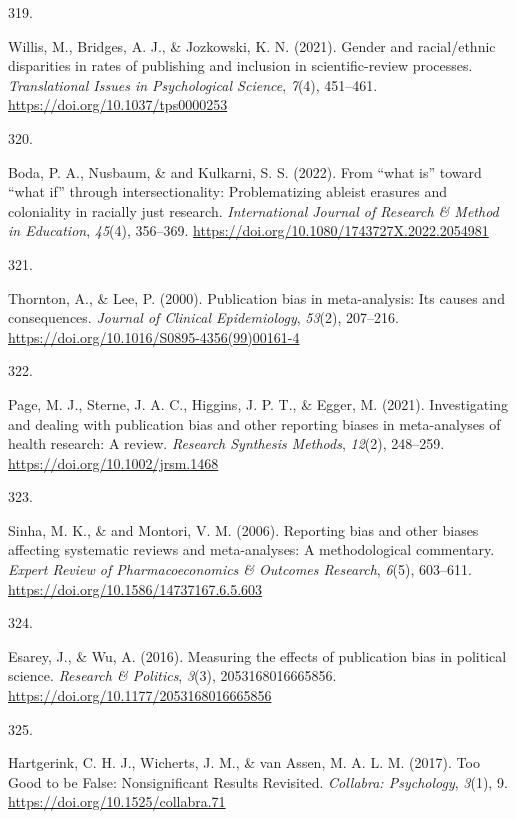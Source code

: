 \documentclass[
  11pt,
  letterpaper,
]{scrreprt}
\newlength{\cslhangindent}
\newlength{\csllabelwidth}
\newenvironment{CSLReferences}[2] %
 {\begin{list}{}{%
  \setlength{\itemindent}{0pt}
  \setlength{\leftmargin}{0pt}
  \setlength{\parsep}{0pt}
  \ifodd #1
   \setlength{\leftmargin}{\cslhangindent}
   \setlength{\itemindent}{-1\cslhangindent}
  \fi
  \setlength{\itemsep}{#2\baselineskip}}}
 {\end{list}}
\newcommand{\CSLLeftMargin}[1]{\parbox[t]{\csllabelwidth}{\strut#1\strut}}
\newcommand{\CSLRightInline}[1]{\parbox[t]{\linewidth - \csllabelwidth}{\strut#1\strut}}
\begin{document}
\begin{CSLReferences}{0}{0}
\CSLLeftMargin{319. }%
\CSLRightInline{Willis, M., Bridges, A. J., \& Jozkowski, K. N. (2021).
Gender and racial/ethnic disparities in rates of publishing and
inclusion in scientific-review processes. \emph{Translational Issues in
Psychological Science}, \emph{7}(4), 451--461.
\url{https://doi.org/10.1037/tps0000253}}

\CSLLeftMargin{320. }%
\CSLRightInline{Boda, P. A., Nusbaum, \& and Kulkarni, S. S. (2022).
From {``what is''} toward {``what if''} through intersectionality:
Problematizing ableist erasures and coloniality in racially just
research. \emph{International Journal of Research \& Method in
Education}, \emph{45}(4), 356--369.
\url{https://doi.org/10.1080/1743727X.2022.2054981}}

\CSLLeftMargin{321. }%
\CSLRightInline{Thornton, A., \& Lee, P. (2000). Publication bias in
meta-analysis: Its causes and consequences. \emph{Journal of Clinical
Epidemiology}, \emph{53}(2), 207--216.
\url{https://doi.org/10.1016/S0895-4356(99)00161-4}}

\CSLLeftMargin{322. }%
\CSLRightInline{Page, M. J., Sterne, J. A. C., Higgins, J. P. T., \&
Egger, M. (2021). Investigating and dealing with publication bias and
other reporting biases in meta-analyses of health research: {A} review.
\emph{Research Synthesis Methods}, \emph{12}(2), 248--259.
\url{https://doi.org/10.1002/jrsm.1468}}

\CSLLeftMargin{323. }%
\CSLRightInline{Sinha, M. K., \& and Montori, V. M. (2006). Reporting
bias and other biases affecting systematic reviews and meta-analyses: A
methodological commentary. \emph{Expert Review of Pharmacoeconomics \&
Outcomes Research}, \emph{6}(5), 603--611.
\url{https://doi.org/10.1586/14737167.6.5.603}}

\CSLLeftMargin{324. }%
\CSLRightInline{Esarey, J., \& Wu, A. (2016). Measuring the effects of
publication bias in political science. \emph{Research \& Politics},
\emph{3}(3), 2053168016665856.
\url{https://doi.org/10.1177/2053168016665856}}

\CSLLeftMargin{325. }%
\CSLRightInline{Hartgerink, C. H. J., Wicherts, J. M., \& van Assen, M.
A. L. M. (2017). Too {Good} to be {False}: {Nonsignificant Results
Revisited}. \emph{Collabra: Psychology}, \emph{3}(1), 9.
\url{https://doi.org/10.1525/collabra.71}}


\end{CSLReferences}
\end{document}
